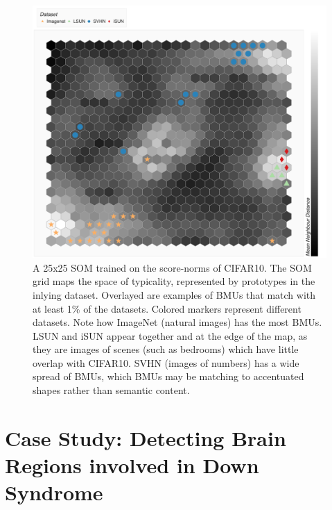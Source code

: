 \begin{figure}[tbhp]
\centering
\includegraphics[width=\textwidth]{figures/cifar_som_hex.png}
\caption{A 25x25 SOM trained on the score-norms of CIFAR10. The SOM grid maps the space of typicality, represented by prototypes in the inlying dataset. Overlayed are examples of BMUs that match with at least 1\% of the datasets. Colored markers represent different datasets. Note how ImageNet (natural images) has the most BMUs. LSUN and iSUN appear together and at the edge of the map, as they are images of scenes (such as bedrooms) which have little overlap with CIFAR10. SVHN (images of numbers) has a wide spread of BMUs, which BMUs may be matching to accentuated shapes rather than semantic content. }
\label{fig:som-cifar}
\end{figure}





\section{Case Study: Detecting Brain Regions involved in Down Syndrome}

